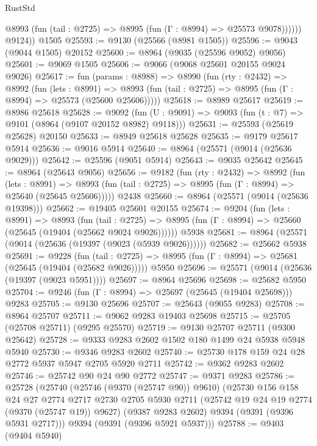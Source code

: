 \begin{lexlean}{RustStd}
\begin{coremodule}
              @8993 (fun (tail : @2725) => @8995 (fun (Γ : @8994) => @25573 @9078))))))
        @9124))
    @1505
@25593 := @9130 (@25566 (@8981 @1505))
@25596 := @9043 (@9044 @1505) @20152
@25600 := @8964 (@9035 (@25596 @9052) @9056)
@25601 := @9069 @1505
@25606 := @9066 (@9068 @25601 @20155 @9024 @9026)
@25617 := fun (params : @8988) =>
  @8990
    (fun (rty : @2432) =>
    @8992
      (fun (lets : @8991) =>
      @8993 (fun (tail : @2725) => @8995 (fun (Γ : @8994) => @25573 (@25600 @25606)))))
@25618 := @8989 @25617
@25619 := @8986 @25618
@25628 := @9092
    (fun (U : @9091) => @9093 (fun (t : @7) => @9101 (@8964 (@9107 @20152 @8982) @9118)))
@25631 := @25593 (@25619 @25628) @20150
@25633 := @8949 @25618 @25628
@25635 := @9179 @25617 @5914
@25636 := @9016 @5914
@25640 := @8964 (@25571 (@9014 (@25636 @9029)))
@25642 := @25596 (@9051 @5914)
@25643 := @9035 @25642
@25645 := @8964 (@25643 @9056)
@25656 := @9182
    (fun (rty : @2432) =>
    @8992
      (fun (lets : @8991) =>
      @8993 (fun (tail : @2725) => @8995 (fun (Γ : @8994) => @25640 (@25645 @25606)))))
    @2438
@25660 := @8964 (@25571 (@9014 (@25636 @19398)))
@25662 := @19405 @25601 @20155
@25674 := @9204
    (fun (lets : @8991) =>
    @8993
      (fun (tail : @2725) =>
      @8995 (fun (Γ : @8994) => @25660 (@25645 (@19404 (@25662 @9024 @9026))))))
    @5938
@25681 := @8964 (@25571 (@9014 (@25636 (@19397 (@9023 (@5939 @9026))))))
@25682 := @25662 @5938
@25691 := @9228
    (fun (tail : @2725) => @8995 (fun (Γ : @8994) => @25681 (@25645 (@19404 (@25682 @9026)))))
    @5950
@25696 := @25571 (@9014 (@25636 (@19397 (@9023 @5951))))
@25697 := @8964 @25696
@25698 := @25682 @5950
@25704 := @9246 (fun (Γ : @8994) => @25697 (@25645 (@19404 @25698))) @9283
@25705 := @9130 @25696
@25707 := @25643 (@9055 @9283)
@25708 := @8964 @25707
@25711 := @9062 @9283 @19403 @25698
@25715 := @25705 (@25708 @25711) (@9295 @25570)
@25719 := @9130 @25707 @25711 (@9300 @25642)
@25728 := @9333 @9283 @2602 @1502 @180 @1499 @24 @5938 @5948 @5940
@25730 := @9346 @9283 @2602
@25740 := @25730 @178 @159 @24 @28 @2772 @5937 @5947 @2705 @5920 @2711
@25742 := @9362 @9283 @2602
@25746 := @25742 @90 @24 @90 @2772
@25747 := @9371 @9283
@25786 := @25728
    (@25740
      (@25746 (@9370 (@25747 @90)) @9610)
      (@25730
        @156
        @158
        @24
        @27
        @2774
        @2717
        @2730
        @2705
        @5930
        @2711
        (@25742 @19 @24 @19 @2774 (@9370 (@25747 @19)) @9627)
        (@9387 @9283 @2602)
        @9394
        (@9391 (@9396 @5931 @2717)))
      @9394
      (@9391 (@9396 @5921 @5937)))
@25788 := @9403 (@9404 @5940)

\end{coremodule}
\end{lexlean}
